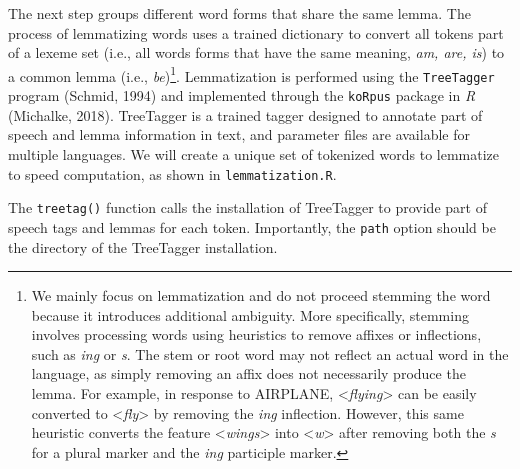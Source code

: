 \documentclass[man]{apa6}
\newenvironment{Shaded}{\begin{snugshade}}{\end{snugshade}}
\newcommand{\CommentTok}[1]{\textcolor[rgb]{0.56,0.35,0.01}{\textit{#1}}}
\newcommand{\DataTypeTok}[1]{\textcolor[rgb]{0.13,0.29,0.53}{#1}}
\newcommand{\KeywordTok}[1]{\textcolor[rgb]{0.13,0.29,0.53}{\textbf{#1}}}
\newcommand{\NormalTok}[1]{#1}
\newcommand{\OperatorTok}[1]{\textcolor[rgb]{0.81,0.36,0.00}{\textbf{#1}}}
\newcommand{\StringTok}[1]{\textcolor[rgb]{0.31,0.60,0.02}{#1}}
\let\rmarkdownfootnote\footnote%
\def\footnote{\protect\rmarkdownfootnote}
\begin{document}
The next step groups different word forms that share the same lemma. The process of lemmatizing words uses a trained dictionary to convert all tokens part of a lexeme set (i.e., all words forms that have the same meaning, \emph{am, are, is}) to a common lemma (i.e., \emph{be})\footnote{We mainly focus on lemmatization and do not proceed stemming the word because it introduces additional ambiguity. More specifically, stemming involves processing words using heuristics to remove affixes or inflections, such as \emph{ing} or \emph{s}. The stem or root word may not reflect an actual word in the language, as simply removing an affix does not necessarily produce the lemma. For example, in response to AIRPLANE, \textless{}\emph{flying}\textgreater{} can be easily converted to \textless{}\emph{fly}\textgreater{} by removing the \emph{ing} inflection. However, this same heuristic converts the feature \textless{}\emph{wings}\textgreater{} into \textless{}\emph{w}\textgreater{} after removing both the \emph{s} for a plural marker and the \emph{ing} participle marker.}. Lemmatization is performed using the \texttt{TreeTagger} program (Schmid, 1994) and implemented through the \texttt{koRpus} package in \emph{R} (Michalke, 2018). TreeTagger is a trained tagger designed to annotate part of speech and lemma information in text, and parameter files are available for multiple languages. We will create a unique set of tokenized words to lemmatize to speed computation, as shown in \texttt{lemmatization.R}.

\scriptsize

\begin{Shaded}
\end{Shaded}

\normalsize

The \texttt{treetag()} function calls the installation of TreeTagger to provide part of speech tags and lemmas for each token. Importantly, the \texttt{path} option should be the directory of the TreeTagger installation.
\end{document}
